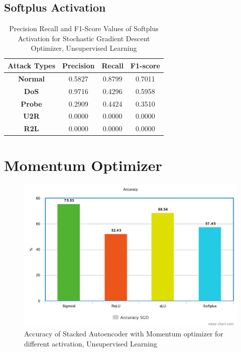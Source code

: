 \documentclass[12pt, a4paper]{report}
\begin{document}
\begin{appendices}
   \subsection{Softplus Activation}
  \begin{table}[h]
		\centering
		\captionsetup{justification=centering,margin=2cm}
		\begin{tabular}{|c|c|c|c|}
		\hline
		\textbf{Attack Types} & \textbf{Precision} & \textbf{Recall} & \textbf{F1-score} \\ \hline
		\textbf{Normal}       & 0.5827             & 0.8799          & 0.7011            \\ \hline
		\textbf{DoS}          & 0.9716             & 0.4296          & 0.5958            \\ \hline
		\textbf{Probe}        & 0.2909             & 0.4424          & 0.3510            \\ \hline
		\textbf{U2R}          & 0.0000             & 0.0000          & 0.0000            \\ \hline
		\textbf{R2L}          & 0.0000             & 0.0000          & 0.0000            \\ \hline
		\end{tabular}
		\caption{Precision Recall and F1-Score Values of Softplus Activation for Stochastic Gradient Descent Optimizer, Unsupervised Learning}
		\label{classification softplus sgd tf}
		\end{table} 



\section{Momentum Optimizer}
\begin{figure}[ht]
	\centering
	\captionsetup{justification=centering,margin=2cm}
	\includegraphics[width=13cm]{SGD_accuracy_tensorflow.png}
	\caption{ Accuracy of Stacked Autoencoder with Momentum optimizer for different activation, Unsupervised Learning }
	\label{fig:acc_sgd_tf}
	\end{figure}
	\clearpage
 

\end{appendices}
\end{document}
